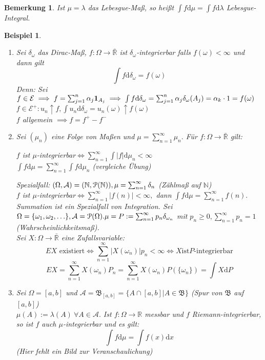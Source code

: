 \documentclass[a4paper,11pt]{scrbook}
\newcommand{\R}{{\mathbb R}}
\newcommand{\N}{{\mathbb N}}
\newcommand{\ind}{\text{\bf{1}}}
\def\AA{ \mathcal{A} }
\def\PM{ \EuScript{P} }
\def\EE{ \mathcal{E} }
\def\BB{ \mathfrak{B} }
\def\folgt{\ensuremath{\implies}}
\def\equizu{\ensuremath{\iff}}
\def\d{\mbox{d}}
\newtheorem{Bsp}{Beispiel}[chapter]
\newtheorem*{BemON}{Bemerkung}
\theoremstyle{nonumberplain}
\begin{document}
\begin{BemON} Ist $\mu=\lambda$ das Lebesgue-Maß, so heißt $\int f\d \mu=\int f\d \lambda$ Lebesgue-Integral.
\end{BemON}

\begin{Bsp} \label{Bsp1.2}
\begin{enumerate}
\item[a)] Sei $\delta_\omega$ das Dirac-Maß, $f:\Omega\to\bar\R$ ist $\delta_\omega$-integrierbar falls $f(\omega)<\infty$ und dann gilt
$$\int f\d \delta_\omega=f(\omega)$$
Denn: Sei $f\in\EE\folgt f=\sum_{j=1}^n \alpha_j \ind_{A_j}\folgt \int f\d\delta_\omega=\sum_{j=1}^n\alpha_j\delta_\omega(A_j)=\alpha_k\cdot 1=f(\omega)$\\
$f\in\EE^+:u_n\uparrow f, \int u_n\d\delta_\omega=u_n(\omega)\uparrow f(\omega)$\\
$f$ allgemein $\folgt f=f^+-f^-$
\item[b)] Sei $(\mu_n)$ eine Folge von Maßen und $\mu=\sum_{n=1}^\infty\mu_n.$ Für $f:\Omega\to\bar\R$ gilt:
\begin{center}
$f$ ist $\mu$-integrierbar$\equizu\sum_{n=1}^\infty\int |f|\d\mu_n<\infty$\\
$\int f\d\mu = \sum_{n=1}^\infty\int f\d\mu_n$ (vergleiche Übung)
\end{center}
Spezialfall: $(\Omega, \AA)=(\N,\PM(\N)), \mu=\sum_{n=1}^\infty\delta_n$ (Zählmaß auf $\N$)\\
$f$ ist $\mu$-integrierbar$\equizu\sum_{n=1}^\infty|f(n)|<\infty,$ dann $\int f\d\mu=\sum_{n=1}^\infty f(n).$\\
Summation ist ein Spezialfall von Integration. 
Sei $\Omega=\{\omega_1, \omega_2, \ldots\}, \AA=\PM(\Omega). \mu=P:=\sum_{n=1}^\infty p_n\delta_{\omega_n}$ mit $p_n\ge 0, \sum_{n=1}^\infty p_n=1$ (Wahrscheinlichkeitsmaß).\\
Sei $X:\Omega\to\bar\R$ eine Zufallsvariable:
$$EX \text{ existiert} \equizu \sum_{n=1}^\infty|X(\omega_n)|p_n<\infty\equizu X \text{ist} P\text{-integrierbar}$$
$$EX = \sum_{n=1}^\infty X(\omega_n)P_n=\sum_{n=1}^\infty X(\omega_n)P(\{\omega_n\})=\int X\d P$$
\item[c)] Sei $\Omega=[a,b]$ und $\AA=\BB_{[a,b]}=\{A\cap [a,b]|A\in\BB\}$ (Spur von $\BB$ auf $[a,b]$)\\
$\mu(A):=\lambda(A)\ \forall A\in\AA.$ Ist $f:\Omega\to\R$ messbar und $f$ Riemann-integrierbar, so ist $f$ auch $\mu$-integrierbar und es gilt:
$$\int f\d\mu=\int f(x)\d x$$
(Hier fehlt ein Bild zur Veranschaulichung)\\

\end{enumerate}
\end{Bsp}
\end{document}
